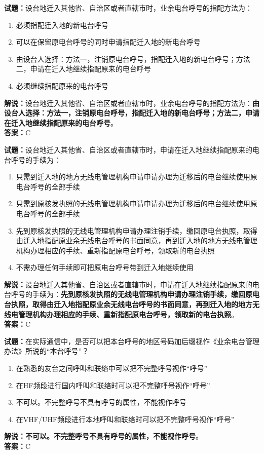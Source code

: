 \documentclass{ctexbook}
\begin{document}
\vspace{\baselineskip}

\noindent\textbf{试题：}设台地迁入其他省、自治区或者直辖市时，业余电台呼号的指配方法为：
\begin{enumerate}[leftmargin=3em]
  \item 必须指配迁入地的新电台呼号
  \item 可以在保留原电台呼号的同时申请指配迁入地的新电台呼号
  \item 由设台人选择：方法一，注销原电台呼号，指配迁入地的新电台呼号；方法二，申请在迁入地继续指配原来的电台呼号
  \item 必须继续指配原来的电台呼号
\end{enumerate}
\noindent\textbf{解说：}设台地迁入其他省、自治区或者直辖市时，业余电台呼号的指配方法为：\textbf{由设台人选择：方法一，注销原电台呼号，指配迁入地的新电台呼号；方法二，申请在迁入地继续指配原来的电台呼号}。\\\noindent\textbf{答案：}C

\vspace{\baselineskip}

\noindent\textbf{试题：}设台地迁入其他省、自治区或者直辖市时，申请在迁入地继续指配原来的电台呼号的手续为：
\begin{enumerate}[leftmargin=3em]
  \item 只需到迁入地的地方无线电管理机构申请申请办理为迁移后的电台继续使用原电台呼号的全部手续
  \item 只需到原核发执照的无线电管理机构申请申请办理为迁移后的电台继续使用原电台呼号的全部手续
  \item 先到原核发执照的无线电管理机构申请办理注销手续，缴回原电台执照，取得由迁入地指配原业余无线电台呼号的书面同意，再到迁入地的地方无线电管理机构办理相应的手续、重新指配原电台呼号，领取新的电台执照
  \item 不需办理任何手续即可把原电台呼号带到迁入地继续使用
\end{enumerate}
\noindent\textbf{解说：}设台地迁入其他省、自治区或者直辖市时，申请在迁入地继续指配原来的电台呼号的手续为：\textbf{先到原核发执照的无线电管理机构申请办理注销手续，缴回原电台执照，取得由迁入地指配原业余无线电台呼号的书面同意，再到迁入地的地方无线电管理机构办理相应的手续、重新指配原电台呼号，领取新的电台执照}。\\\noindent\textbf{答案：}C

\vspace{\baselineskip}

\noindent\textbf{试题：}在实际通信中，是否可以把本台呼号的地区号码加后缀视作《业余电台管理办法》所说的“本台呼号”？
\begin{enumerate}[leftmargin=3em]
  \item 在熟悉的友台之间呼叫和联络中可以把不完整呼号视作“呼号”
  \item 在HF频段进行国内呼叫和联络时可以把不完整呼号视作“呼号”
  \item 不可以。不完整呼号不具有呼号的属性，不能视作呼号
  \item 在VHF/UHF频段进行本地呼叫和联络时可以把不完整呼号视作“呼号”
\end{enumerate}
\textbf{解说：不可以。不完整呼号不具有呼号的属性，不能视作呼号}。\\\noindent\textbf{答案：}C
\end{document}
